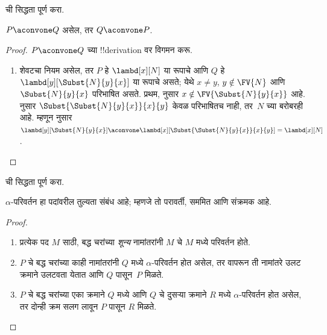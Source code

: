 \documentclass[../../../include/open-logic-section]{subfiles}
\begin{document}
\begin{prob}
   ची सिद्धता पूर्ण करा.
\end{prob}

\begin{lem}
  $P \aconvone Q$ असेल, तर $Q \aconvone P$.
\end{lem}

\begin{proof}
  $P \aconvone Q$ च्या !!{derivation} वर विगमन करू.
  \begin{enumerate}
  \item शेवटचा नियम  असेल, तर $P$
    हे $\lambd[x][N]$ या रूपाचे आणि $Q$ हे
    $\lambd[y][\Subst{N}{y}{x}]$ या रूपाचे असते;
    येथे $x \neq y$, $y \notin \FV{N}$ आणि
    $\Subst{N}{y}{x}$ परिभाषित असते. प्रथम,
     नुसार $x \notin
    \FV{\Subst{N}{y}{x}}$ आहे. 
    नुसार $\Subst{\Subst{N}{y}{x}}{x}{y}$ केवळ
    परिभाषितच नाही, तर~$N$ च्या बरोबरही आहे. म्हणून
     नुसार
    $\lambd[y][\Subst{N}{y}{x}]
    \aconvone \lambd[x][\Subst{\Subst{N}{y}{x}}{x}{y}] =
    \lambd[x][N]$.
  \end{enumerate}
\end{proof}

\begin{prob}
   ची सिद्धता पूर्ण करा.
\end{prob}

\begin{thm}
  $\alpha$-परिवर्तन हा पदांवरील तुल्यता संबंध आहे;
  म्हणजे तो परावर्ती, सममित आणि संक्रमक आहे.
\end{thm}

\begin{proof}
  \begin{enumerate}
  \item प्रत्येक पद $M$ साठी, बद्ध चरांच्या \emph{शून्य}
    नामांतरांनी $M$ चे $M$ मध्ये परिवर्तन होते.
  \item $P$ चे बद्ध चरांच्या काही नामांतरांनी $Q$ मध्ये
    $\alpha$-परिवर्तन होत असेल, तर 
    वापरून ती नामांतरे उलट क्रमाने उलटवता येतात आणि
    $Q$ पासून~$P$ मिळते.
  \item $P$ चे बद्ध चरांच्या एका क्रमाने $Q$ मध्ये आणि
    $Q$ चे दुसऱ्या क्रमाने $R$ मध्ये $\alpha$-परिवर्तन
    होत असेल, तर दोन्ही क्रम सलग लावून $P$ पासून
    $R$ मिळते.
  \end{enumerate}
\end{proof}
\end{document}
